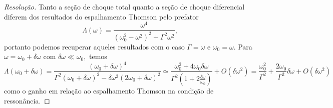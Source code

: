 \begin{proof}[Resolução]
   Tanto a seção de choque total quanto a seção de choque diferencial diferem dos resultados do espalhamento Thomson pelo prefator
   \begin{equation*}
      \Lambda(\omega) = \frac{\omega^4}{\left(\omega_0^2 - \omega^2\right)^2 + \Gamma^2\omega^2},
   \end{equation*}
   portanto podemos recuperar aqueles resultados com o caso \(\Gamma = \omega\) e \(\omega_0 = \omega\). Para \(\omega = \omega_0 + \delta \omega\) com \(\delta \omega \ll \omega_0,\) temos
   \begin{equation*}
      \Lambda(\omega_0 + \delta \omega) = \frac{(\omega_0 + \delta \omega)^4}{\Gamma^2(\omega_0 + \delta \omega)^2-\delta\omega^2(2 \omega_0 + \delta \omega)^2} \simeq \frac{\omega_0^2 + 4 \omega_0 \delta \omega}{\Gamma^2 \left(1 + 2 \frac{\delta \omega}{\omega_0}\right)} + O(\delta \omega^2) = \frac{\omega_0^2}{\Gamma^2} + \frac{2 \omega_0}{\Gamma^2} \delta \omega + O(\delta \omega^2)
   \end{equation*}
   como o ganho em relação ao espalhamento Thomson na condição de ressonância.
\end{proof}
